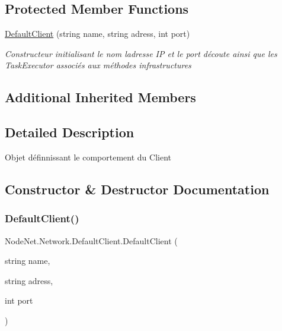 \subsection*{Protected Member Functions}
\begin{DoxyCompactItemize}
\item 
\hyperlink{class_node_net_1_1_network_1_1_default_client_a214fe149a61aa7e46e9bb9ce27880d83}{Default\+Client} (string name, string adress, int port)
\begin{DoxyCompactList}\small\item\em Constructeur initialisant le nom l\textquotesingle{}adresse IP et le port d\textquotesingle{}écoute ainsi que les Task\+Executor associés aux méthodes infrastructures \end{DoxyCompactList}\end{DoxyCompactItemize}
\subsection*{Additional Inherited Members}


\subsection{Detailed Description}
Objet définnissant le comportement du Client 



\subsection{Constructor \& Destructor Documentation}
\mbox{\label{class_node_net_1_1_network_1_1_default_client_a214fe149a61aa7e46e9bb9ce27880d83}} 
\subsubsection{\texorpdfstring{Default\+Client()}{DefaultClient()}}
{\footnotesize\ttfamily Node\+Net.\+Network.\+Default\+Client.\+Default\+Client (\begin{DoxyParamCaption}\item[{string}]{name,  }\item[{string}]{adress,  }\item[{int}]{port }\end{DoxyParamCaption})\hspace{0.3cm}{\ttfamily [protected]}}



